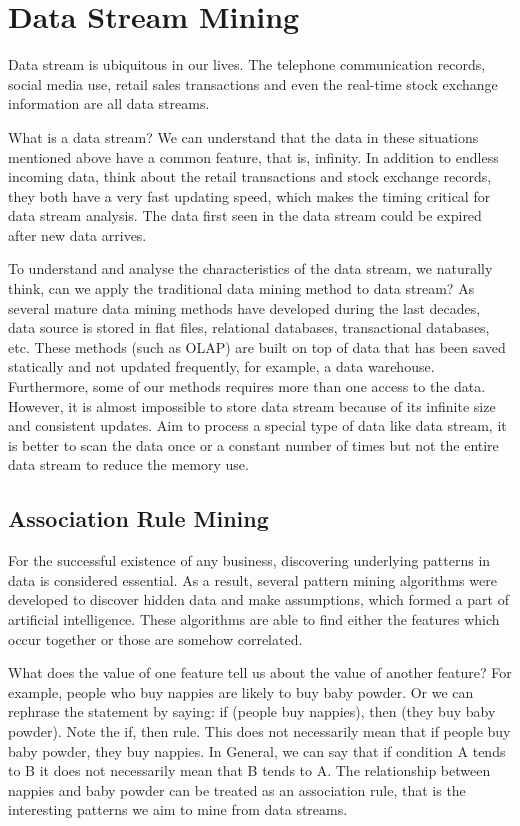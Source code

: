 \section{Data Stream Mining}

Data stream is ubiquitous in our lives. The telephone communication records, social media use, retail sales transactions and even the real-time stock exchange information are all data streams.

What is a data stream? We can understand that the data in these situations mentioned above have a common feature, that is, infinity. In addition to endless incoming data, think about the retail transactions and stock exchange records, they both have a very fast updating speed, which makes the timing critical for data stream analysis. The data first seen in the data stream could be expired after new data arrives. 

To understand and analyse the characteristics of the data stream, we naturally think, can we apply the traditional data mining method to data stream? As several mature data mining methods have developed during the last decades, data source is stored in flat files, relational databases, transactional databases, etc. These methods (such as OLAP) are built on top of data that has been saved statically and not updated frequently, for example, a data warehouse. Furthermore, some of our methods requires more than one access to the data. However, it is almost impossible to store data stream because of its infinite size and consistent updates. Aim to process a special type of data like data stream, it is better to scan the data once or a constant number of times but not the entire data stream to reduce the memory use. 

\subsection{Association Rule Mining}
For the successful existence of any business, discovering underlying patterns in data is considered essential. As a result, several pattern mining algorithms were developed to discover hidden data and make assumptions, which formed a part of artificial intelligence. These algorithms are able to find either the features which occur together or those are somehow correlated. 

What does the value of one feature tell us about the value of another feature? For example, people who buy nappies are likely to buy baby powder. Or we can rephrase the statement by saying: if (people buy nappies), then (they buy baby powder). Note the if, then rule. This does not necessarily mean that if people buy baby powder, they buy nappies. In General, we can say that if condition A tends to B it does not necessarily mean that B tends to A. The relationship between nappies and baby powder can be treated as an association rule, that is the interesting patterns we aim to mine from data streams.

